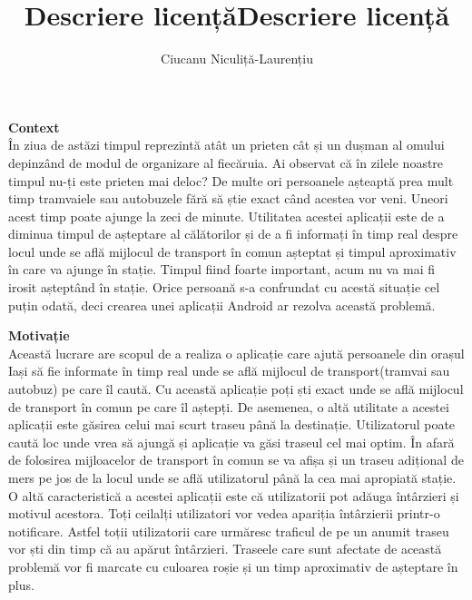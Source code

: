 \documentclass[a4paper]{article}
\begin{document}
\title{\textbf{{Descriere licență}{\Large }}}
\title{Descriere licență}
\author{Ciucanu Niculiță-Laurențiu}
\date{}
\maketitle

\textbf{Context}\\

În ziua de astăzi timpul reprezintă atât un prieten cât și un dușman al omului depinzând de modul de organizare al fiecăruia. Ai observat că în zilele noastre timpul nu-ți este prieten mai deloc? De multe ori persoanele așteaptă prea mult timp tramvaiele sau autobuzele fără să știe exact când acestea vor veni. Uneori acest timp poate ajunge la zeci de minute. Utilitatea acestei aplicații este de a diminua timpul de așteptare al călătorilor și de a fi informați în timp real despre locul unde se află mijlocul de transport în comun așteptat și timpul aproximativ în care va ajunge în stație. Timpul fiind foarte important, acum nu va mai fi irosit așteptând în stație. Orice persoană s-a confrundat cu acestă situație cel puțin odată, deci crearea unei aplicații Android ar rezolva această problemă. 
\newline
\newline

\textbf{Motivație}\\

Această lucrare are scopul de a realiza o aplicație care ajută persoanele din orașul Iași să fie informate în timp real unde se află mijlocul de transport(tramvai sau autobuz) pe care îl caută.
Cu această aplicație poți ști exact unde se află mijlocul de transport în comun pe care îl aștepți. De asemenea, o altă utilitate a acestei aplicații este găsirea celui mai scurt traseu până la destinație. Utilizatorul poate caută loc unde vrea să ajungă și aplicație va găsi traseul cel mai optim. În afară de folosirea mijloacelor de transport în comun se va afișa și un traseu adițional de mers pe jos de la locul unde se află utilizatorul  până la cea mai apropiată stație. O altă caracteristică a acestei aplicații este că utilizatorii pot adăuga întârzieri și motivul acestora. Toți ceilalți utilizatori vor vedea apariția întârzierii printr-o notificare. Astfel toții utilizatorii care urmăresc traficul de pe un anumit traseu vor ști din timp că au apărut întârzieri. Traseele care sunt afectate de această problemă vor fi marcate cu culoarea roșie și un timp aproximativ de așteptare în plus.
\end{document}
